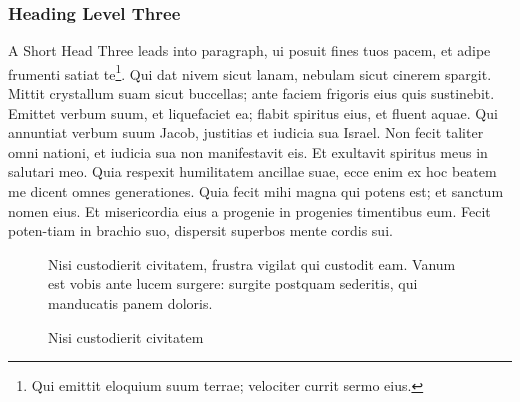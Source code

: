 \documentclass[pdftex,crc]{ios-book}
\begin{document}
\subsubsection{Heading Level Three}

A Short Head Three leads into paragraph, ui posuit fines tuos pacem,
et adipe frumenti satiat te\footnote{Qui emittit eloquium suum terrae;
velociter currit sermo eius.}.  Qui dat nivem sicut lanam, nebulam
sicut cinerem spargit. Mittit crystallum suam sicut buccellas; ante
faciem frigoris eius quis sustinebit. Emittet verbum suum, et
liquefaciet ea; flabit spiritus eius, et fluent aquae. Qui annuntiat
verbum suum Jacob, justitias et iudicia sua Israel. Non fecit taliter omni
nationi, et iudicia sua non manifestavit eis. Et exultavit spiritus meus
in salutari meo.  Quia respexit humilitatem ancillae suae, ecce enim ex
hoc beatem me dicent omnes generationes. Quia fecit mihi magna qui potens
est; et sanctum nomen eius. Et misericordia eius a progenie in progenies
timentibus eum. Fecit poten-tiam in brachio suo, dispersit superbos mente
cordis sui.




\begin{figure}[t]
\vspace*{40mm}
\caption{Nisi custodierit civitatem, frustra vigilat qui custodit eam. Vanum
est vobis ante lucem surgere: surgite postquam sederitis, qui
manducatis panem doloris.}
\end{figure}

\begin{figure}[t]
\vspace*{40mm}
\caption{Nisi custodierit civitatem}
\end{figure}
\end{document}
